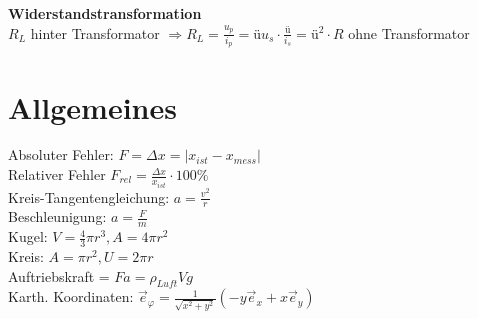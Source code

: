\documentclass[a4paper, 6pt, landscape]{scrartcl}
\begin{document}
\begin{multicols*}{4}
    \textbf{Widerstandstransformation} \\$R_L$ hinter Transformator $\Rightarrow R_L = \frac{u_p}{i_p} = ü u_s \cdot \frac{ü}{i_s}=  ü^2 \cdot R$ ohne Transformator



\vfill \null \columnbreak
	\section{Allgemeines}


  Absoluter Fehler: $F = \Delta x = | x_{ist} - x_{mess}|$\\
  Relativer Fehler $ F_{rel} = \frac{\Delta x}{x_{ist}} \cdot 100 \%$ \\
  Kreis-Tangentengleichung:  $a=\frac{v^2}{r}$ \\
  Beschleunigung: $a=\frac{F}{m}$ \\
  Kugel: $V = \frac{4}{3}\pi r^3, A = 4 \pi r^2$ \\
  Kreis: $A = \pi r^2, U = 2 \pi r$\\
  Auftriebskraft = $Fa = \rho_{Luft}Vg$\\
  Karth. Koordinaten: $\vec{e}_\varphi  = \frac{1}{\sqrt{x^2 + y^2}} ( -y \vec{e}_x + x \vec{e}_y)$



\end{multicols*}
\end{document}

